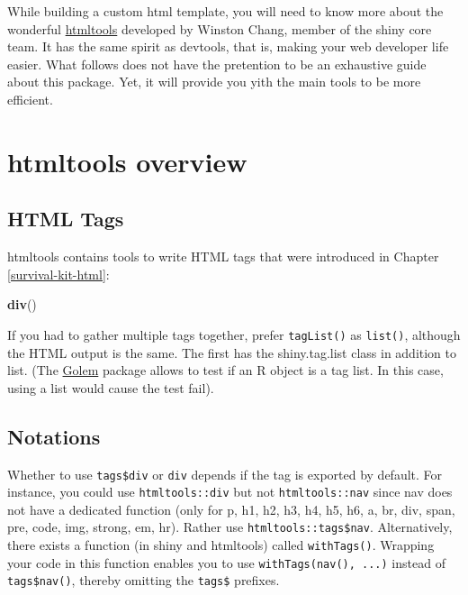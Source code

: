 \documentclass[
]{book}
\newenvironment{Shaded}{\begin{snugshade}}{\end{snugshade}}
\newcommand{\KeywordTok}[1]{\textcolor[rgb]{0.13,0.29,0.53}{\textbf{#1}}}
\newcommand{\NormalTok}[1]{#1}
\begin{document}
While building a custom html template, you will need to know more about the wonderful \href{https://github.com/rstudio/htmltools}{htmltools} developed by Winston Chang, member of the shiny core team. It has the same spirit as devtools, that is, making your web developer life easier. What follows does not have the pretention to be an exhaustive guide about this package. Yet, it will provide you yith the main tools to be more efficient.

\hypertarget{htmltools-overview}{%
\chapter{htmltools overview}\label{htmltools-overview}}

\hypertarget{html-tags}{%
\section{HTML Tags}\label{html-tags}}

htmltools contains tools to write HTML tags that were introduced in Chapter \ref{survival-kit-html}:

\begin{Shaded}
\begin{Highlighting}[]
\KeywordTok{div}\NormalTok{()}
\end{Highlighting}
\end{Shaded}

If you had to gather multiple tags together, prefer \texttt{tagList()} as \texttt{list()}, although the HTML output is the same. The first has the shiny.tag.list class in addition to list. (The \href{http://golemverse.org}{Golem} package allows to test if an R object is a tag list. In this case, using a list would cause the test fail).

\hypertarget{notations}{%
\section{Notations}\label{notations}}

Whether to use \texttt{tags\$div} or \texttt{div} depends if the tag is exported by default.
For instance, you could use \texttt{htmltools::div} but not \texttt{htmltools::nav} since nav does not have a dedicated function (only for p, h1, h2, h3, h4, h5, h6, a, br, div, span, pre, code, img, strong, em, hr).
Rather use \texttt{htmltools::tags\$nav}. Alternatively, there exists a function (in shiny and htmltools)
called \texttt{withTags()}. Wrapping your code in this function enables you to use \texttt{withTags(nav(),\ ...)} instead of \texttt{tags\$nav()}, thereby omitting the \texttt{tags\$} prefixes.
\end{document}
